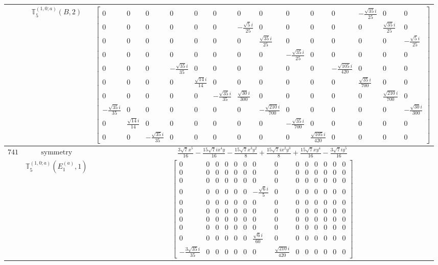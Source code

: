 \documentclass[fleqn,8pt,landscape]{jsarticle}
\begin{document}
\begin{longtable}{ccc}
$  $ & $ \mathbb{T}_{5}^{(1,0;a)}(B,2) $ & $ \begin{bmatrix} 0 & 0 & 0 & 0 & 0 & 0 & 0 & 0 & 0 & 0 & 0 & - \frac{\sqrt{35} i}{25} & 0 & 0 \\ 0 & 0 & 0 & 0 & 0 & 0 & - \frac{\sqrt{5} i}{25} & 0 & 0 & 0 & 0 & 0 & \frac{\sqrt{35} i}{25} & 0 \\ 0 & 0 & 0 & 0 & 0 & 0 & 0 & \frac{\sqrt{35} i}{25} & 0 & 0 & 0 & 0 & 0 & - \frac{\sqrt{5} i}{25} \\ 0 & 0 & 0 & 0 & 0 & 0 & 0 & 0 & - \frac{\sqrt{35} i}{25} & 0 & 0 & 0 & 0 & 0 \\ 0 & 0 & 0 & - \frac{\sqrt{35} i}{35} & 0 & 0 & 0 & 0 & 0 & 0 & - \frac{\sqrt{105} i}{420} & 0 & 0 & 0 \\ 0 & 0 & 0 & 0 & \frac{\sqrt{14} i}{14} & 0 & 0 & 0 & 0 & 0 & 0 & \frac{\sqrt{35} i}{700} & 0 & 0 \\ 0 & 0 & 0 & 0 & 0 & - \frac{\sqrt{35} i}{35} & \frac{\sqrt{30} i}{300} & 0 & 0 & 0 & 0 & 0 & \frac{\sqrt{210} i}{700} & 0 \\ - \frac{\sqrt{35} i}{35} & 0 & 0 & 0 & 0 & 0 & 0 & - \frac{\sqrt{210} i}{700} & 0 & 0 & 0 & 0 & 0 & - \frac{\sqrt{30} i}{300} \\ 0 & \frac{\sqrt{14} i}{14} & 0 & 0 & 0 & 0 & 0 & 0 & - \frac{\sqrt{35} i}{700} & 0 & 0 & 0 & 0 & 0 \\ 0 & 0 & - \frac{\sqrt{35} i}{35} & 0 & 0 & 0 & 0 & 0 & 0 & \frac{\sqrt{105} i}{420} & 0 & 0 & 0 & 0 \end{bmatrix} $ \\ \hline
$ 741 $ & $ \text{symmetry} $ & $ \frac{3 \sqrt{7} x^{5}}{16} - \frac{15 \sqrt{7} i x^{4} y}{16} - \frac{15 \sqrt{7} x^{3} y^{2}}{8} + \frac{15 \sqrt{7} i x^{2} y^{3}}{8} + \frac{15 \sqrt{7} x y^{4}}{16} - \frac{3 \sqrt{7} i y^{5}}{16} $ \\
$  $ & $ \mathbb{T}_{5}^{(1,0;a)}(E_{1}^{(a)},1) $ & $ \begin{bmatrix} 0 & 0 & 0 & 0 & 0 & 0 & 0 & 0 & 0 & 0 & 0 & 0 & 0 & 0 \\ 0 & 0 & 0 & 0 & 0 & 0 & 0 & 0 & 0 & 0 & 0 & 0 & 0 & 0 \\ 0 & 0 & 0 & 0 & 0 & 0 & 0 & 0 & 0 & 0 & 0 & 0 & 0 & 0 \\ 0 & 0 & 0 & 0 & 0 & 0 & - \frac{\sqrt{6} i}{5} & 0 & 0 & 0 & 0 & 0 & 0 & 0 \\ 0 & 0 & 0 & 0 & 0 & 0 & 0 & 0 & 0 & 0 & 0 & 0 & 0 & 0 \\ 0 & 0 & 0 & 0 & 0 & 0 & 0 & 0 & 0 & 0 & 0 & 0 & 0 & 0 \\ 0 & 0 & 0 & 0 & 0 & 0 & 0 & 0 & 0 & 0 & 0 & 0 & 0 & 0 \\ 0 & 0 & 0 & 0 & 0 & 0 & 0 & 0 & 0 & 0 & 0 & 0 & 0 & 0 \\ 0 & 0 & 0 & 0 & 0 & 0 & \frac{\sqrt{6} i}{60} & 0 & 0 & 0 & 0 & 0 & 0 & 0 \\ - \frac{3 \sqrt{35} i}{35} & 0 & 0 & 0 & 0 & 0 & 0 & \frac{\sqrt{210} i}{420} & 0 & 0 & 0 & 0 & 0 & 0 \end{bmatrix} $ \\ \hline

\end{longtable}
\end{document}
